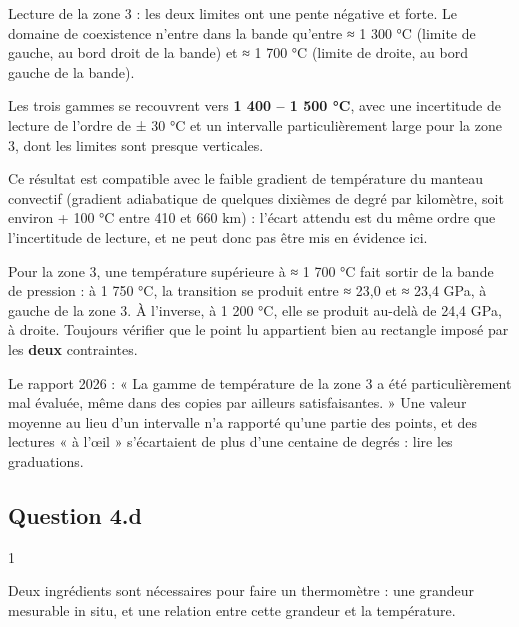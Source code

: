 \documentclass[11pt,a4paper]{article}
\begin{document}
Lecture de la zone 3 : les deux limites ont une pente négative et forte. Le domaine de coexistence n'entre dans la bande qu'entre ≈ 1 300 °C (limite de gauche, au bord droit de la bande) et ≈ 1 700 °C (limite de droite, au bord gauche de la bande).

Les trois gammes se recouvrent vers \textbf{1 400 -- 1 500 °C}, avec une incertitude de lecture de l'ordre de ± 30 °C et un intervalle particulièrement large pour la zone 3, dont les limites sont presque verticales.

Ce résultat est compatible avec le faible gradient de température du manteau convectif (gradient adiabatique de quelques dixièmes de degré par kilomètre, soit environ + 100 °C entre 410 et 660 km) : l'écart attendu est du même ordre que l'incertitude de lecture, et ne peut donc pas être mis en évidence ici.

\begin{piege}

Pour la zone 3, une température supérieure à ≈ 1 700 °C fait sortir de la bande de pression : à 1 750 °C, la transition se produit entre ≈ 23,0 et ≈ 23,4 GPa, à gauche de la zone 3. À l'inverse, à 1 200 °C, elle se produit au-delà de 24,4 GPa, à droite. Toujours vérifier que le point lu appartient bien au rectangle imposé par les \textbf{deux} contraintes.

\end{piege}

\begin{jury}

Le rapport 2026 : « La gamme de température de la zone 3 a été particulièrement mal évaluée, même dans des copies par ailleurs satisfaisantes. » Une valeur moyenne au lieu d'un intervalle n'a rapporté qu'une partie des points, et des lectures « à l'œil » s'écartaient de plus d'une centaine de degrés : lire les graduations.

\end{jury}

\hypertarget{question-4.d}{%
\subsection{Question 4.d}\label{question-4.d}}

\begin{indication}{1}

Deux ingrédients sont nécessaires pour faire un thermomètre : une grandeur mesurable in situ, et une relation entre cette grandeur et la température.

\end{indication}
\end{document}
